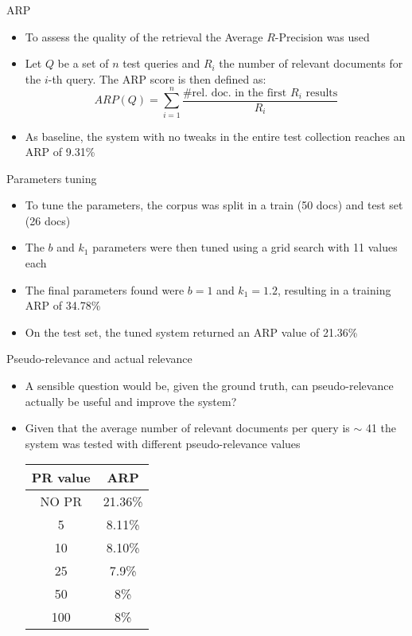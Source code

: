 \documentclass[]{beamer}
\begin{document}
\begin{frame}{ARP}
    \begin{itemize}
        \item To assess the quality of the retrieval the Average $R$-Precision was used
        \item Let $Q$ be a set of $n$ test queries and $R_i$ the number of relevant documents for the $i$-th query.
            The ARP score is then defined as:
            \begin{equation*}
                ARP(Q) = \sum_{i=1}^{n} \frac{\text{\# rel. doc. in the first } R_i \text{ results}}{R_i}
            \end{equation*}
        \item As baseline, the system with no tweaks in the entire test collection reaches an ARP of 9.31\% 
    \end{itemize}
\end{frame}

\begin{frame}{Parameters tuning}
    \begin{itemize}
        \item To tune the parameters, the corpus was split in a train (50 docs) and test set (26 docs)
        \item The $b$ and $k_1$ parameters were then tuned using a grid search with 11 values each
        \item The final parameters found were $b=1$ and $k_1 = 1.2$, resulting in a training ARP of 34.78\%
        \item On the test set, the tuned system returned an ARP value of 21.36\%
    \end{itemize}
\end{frame}

\begin{frame}{Pseudo-relevance and actual relevance}
    \begin{itemize}
        \item A sensible question would be, given the ground truth, can pseudo-relevance actually be useful and improve the system?
        \item Given that the average number of relevant documents per query is $\sim$ 41 the system was tested with different pseudo-relevance values
        \vfill
        
        \begin{center}
            \begin{tabular}{c|c}
                PR value & ARP \\
                \hline 
                NO PR & 21.36\% \\
                5 & 8.11\% \\ 
                10 & 8.10\% \\
                25 & 7.9\% \\
                50 & 8\% \\ 
                100 & 8\% \\
            \end{tabular}
        \end{center}
    \end{itemize}
\end{frame}
\end{document}
